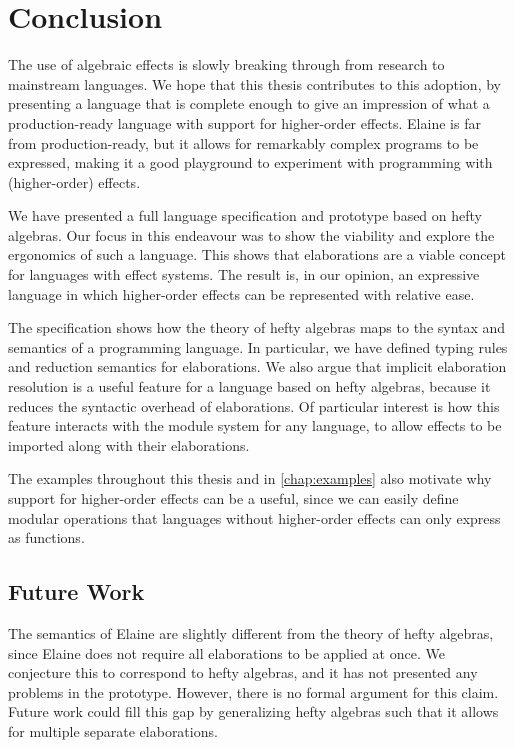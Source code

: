 \chapter{Conclusion}\label{chap:conclusion}

The use of algebraic effects is slowly breaking through from research to mainstream languages. We hope that this thesis contributes to this adoption, by presenting a language that is complete enough to give an impression of what a production-ready language with support for higher-order effects. Elaine is far from production-ready, but it allows for remarkably complex programs to be expressed, making it a good playground to experiment with programming with (higher-order) effects.

We have presented a full language specification and prototype based on hefty algebras. Our focus in this endeavour was to show the viability and explore the ergonomics of such a language. This shows that elaborations are a viable concept for languages with effect systems. The result is, in our opinion, an expressive language in which higher-order effects can be represented with relative ease.

The specification shows how the theory of hefty algebras maps to the syntax and semantics of a programming language. In particular, we have defined typing rules and reduction semantics for elaborations. We also argue that implicit elaboration resolution is a useful feature for a language based on hefty algebras, because it reduces the syntactic overhead of elaborations. Of particular interest is how this feature interacts with the module system for any language, to allow effects to be imported along with their elaborations.

The examples throughout this thesis and in \cref{chap:examples} also motivate why support for higher-order effects can be a useful, since we can easily define modular operations that languages without higher-order effects can only express as functions.

\section{Future Work}

The semantics of Elaine are slightly different from the theory of hefty algebras, since Elaine does not require all elaborations to be applied at once. We conjecture this to correspond to hefty algebras, and it has not presented any problems in the prototype. However, there is no formal argument for this claim. Future work could fill this gap by generalizing hefty algebras such that it allows for multiple separate elaborations.

